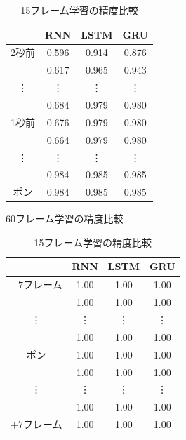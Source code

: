 \begin{table}[h]
       \hspace{0.1\textwidth}
       \begin{subtable}{0.3\textwidth}
           \centering
           \begin{tabular}{c||c|c|c}
              & RNN & LSTM & GRU \\ \hline\hline
              2秒前 & 0.596 & 0.914 & 0.876 \\ \hline
               & 0.617 & 0.965 & 0.943 \\ \hline
              \vdots & \vdots & \vdots & \vdots \\ \hline
               & 0.684 & 0.979 & 0.980 \\ \hline
              1秒前 & 0.676 & 0.979 & 0.980 \\ \hline
               & 0.664 & 0.979 & 0.980 \\ \hline
              \vdots & \vdots & \vdots & \vdots \\ \hline
               & 0.984 & 0.985 & 0.985 \\ \hline
              ポン & 0.984 & 0.985 & 0.985 \\ \hline
           \end{tabular}
           \caption{60フレーム学習の精度比較}
           \label{tb:60frame}
       \end{subtable}
       \hspace{0.1\textwidth}
       \begin{subtable}{0.3\textwidth}
           \centering
           \begin{tabular}{c||c|c|c}
              & RNN & LSTM & GRU \\ \hline\hline
              $-7$フレーム & 1.00 & 1.00 & 1.00 \\ \hline
               & 1.00 & 1.00 & 1.00 \\ \hline
              \vdots & \vdots & \vdots & \vdots \\ \hline
               & 1.00 & 1.00 & 1.00 \\ \hline
              ポン & 1.00 & 1.00 & 1.00 \\ \hline
               & 1.00 & 1.00 & 1.00 \\ \hline
              \vdots & \vdots & \vdots & \vdots \\ \hline
               & 1.00 & 1.00 & 1.00 \\ \hline
               $+7$フレーム& 1.00 & 1.00 & 1.00 \\ \hline
           \end{tabular}
           \caption{15フレーム学習の精度比較}
           \label{tb:15frame}
       \end{subtable}%
   \end{table}

